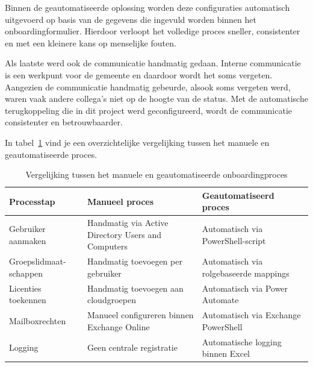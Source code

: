 Binnen de geautomatiseerde oplossing worden deze configuraties automatisch uitgevoerd op basis van de gegevens die ingevuld worden binnen het onboardingformulier. Hierdoor verloopt het volledige proces sneller, consistenter en met een kleinere kans op menselijke fouten.

Als laatste werd ook de communicatie handmatig gedaan. Interne communicatie is een werkpunt voor de gemeente en daardoor wordt het soms vergeten. Aangezien de communicatie handmatig gebeurde, alsook soms vergeten werd, waren vaak andere collega's niet op de hoogte van de status. Met de automatische terugkoppeling die in dit project werd geconfigureerd, wordt de communicatie consistenter en betrouwbaarder. 

In tabel~\ref{tab:VergelijkingOnboarding} vind je een overzichtelijke vergelijking tussen het manuele en geautomatiseerde proces.

\begin{table}[htbp]
    \centering    
    \begin{tabular}{|p{4cm}|p{5cm}|p{5cm}|}
        \hline
        \textbf{Processtap} & \textbf{Manueel proces} & \textbf{Geautomatiseerd proces} \\
        \hline
        
        Gebruiker aanmaken &
        Handmatig via Active Directory Users and Computers &
        Automatisch via PowerShell-script \\
        \hline
        
        Groepslidmaat-schappen &
        Handmatig toevoegen per gebruiker &
        Automatisch via rolgebaseerde mappings \\
        \hline
        
        Licenties toekennen &
        Handmatig toevoegen aan cloudgroepen &
        Automatisch via Power Automate \\
        \hline
        
        Mailboxrechten &
        Manueel configureren binnen Exchange Online &
        Automatisch via Exchange PowerShell \\
        \hline
        
        Logging &
        Geen centrale registratie &
        Automatische logging binnen Excel \\
        \hline
    \end{tabular}
    \caption{Vergelijking tussen het manuele en geautomatiseerde onboardingproces}
    \label{tab:VergelijkingOnboarding}
\end{table}

